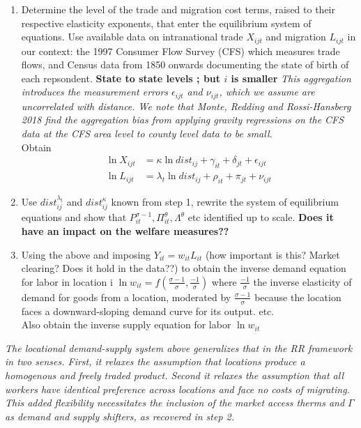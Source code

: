 \documentclass[12pt, final]{article}
\begin{document}
\begin{enumerate}
    \item Determine the level of the trade and migration cost terms, raised to their respective elasticity exponents, that enter the equilibrium system of equations. Use available data on intranational trade $X_{ijt}$ and migration $L_{ijt}$ in our context: the 1997 Consumer Flow Survey (CFS) which measures trade flows, and Census data from 1850 onwards documenting the state of birth of each repsondent. \textbf{State to state levels ; but $i$ is smaller} \textit{This aggregation introduces the measurement errors $\epsilon_{ijt}$ and $\nu_{ijt}$, which we assume are uncorrelated with distance. We note that Monte, Redding and Rossi-Hansberg 2018 find the aggregation bias from applying gravity regressions on the CFS data at the CFS area level to county level data to be small.}
    \\
    Obtain
    \begin{align*}
        \ln X_{ijt} &= \kappa \ln dist_{ij} + \gamma_{it} + \delta_{jt} + \epsilon_{ijt} \\
        \ln L_{ijt} &= \lambda_t \ln dist_{ij} + \rho_{it} + \pi_{jt} + \nu_{ijt}
    \end{align*}
    \item Use $dist_{ij}^{\lambda_t}$ and $dist_{ij}^{\kappa}$ known from step 1, rewrite the system of equilibrium equations and show that $P_{it}^{\sigma-1}, \Pi_{it}^\theta, \Lambda^\theta$ etc identified up to scale. \textbf{Does it have an impact on the welfare measures??}
    \item Using the above and imposing $Y_{it} = w_{it} L_{it}$ (how important is this? Market clearing? Does it hold in the data??) to obtain the inverse demand equation for labor in location i $\ln w_{it} = f(\frac{\sigma-1}{\sigma}, \frac{-1}{\sigma})$ where $\frac{-1}{\sigma}$ the inverse elasticity of demand for goods from a location, moderated by $\frac{\sigma-1}{\sigma}$ because the location faces a downward-sloping demand curve for its output. etc.
    \\
    Also obtain the inverse supply equation for labor $\ln w_{it}$
\end{enumerate}
\textit{The locational demand-supply system above generalizes that in the RR framework in two senses. First, it relaxes the assumption that locations produce a homogenous and freely traded product. Second it relaxes the assumption that all workers have identical preference across locations and face no costs of migrating. This added flexibility necessitates the inclusion of the market access therms and $\Gamma$ as demand and supply shifters, as recovered in step 2.}
\end{document}

